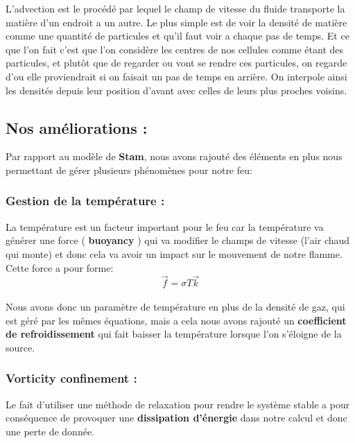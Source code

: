 \documentclass[a4paper,10pt]{article}
\begin{document}
\begin{enumerate}
  L'advection est le procédé par lequel le
    champ de vitesse du fluide transporte la matière d'un endroit a un
    autre. Le plus simple est de voir la densité de matière comme une
    quantité de particules et qu'il faut voir a chaque pas de
    temps. Et ce que l'on fait c'est que l'on considère les centres de
    nos cellules comme étant des particules, et plutôt que de regarder
    ou vont se rendre ces particules, on regarde d'ou elle
    proviendrait si on faisait un pas de temps en arrière. On
    interpole ainsi les densités depuis leur position d'avant avec
    celles de leurs plus proches voisins.\\
\end{enumerate}

\subsection{Nos améliorations :}
Par rapport au modèle de \textbf{Stam}, nous avons rajouté des éléments en plus 
nous permettant de gérer plusieurs phénomènes pour notre feu:\\
 
\subsubsection{Gestion de la température :}
La température est un facteur important pour le feu car la température
va générer une force ( \textbf{buoyancy} ) qui va modifier le champs de vitesse 
(l'air chaud qui monte) et donc cela va avoir un impact sur le mouvement de notre
flamme.\\ 
Cette force a pour forme:\\
\begin{equation}
	\vec{f} = \sigma T \vec{k} 
\end{equation}
\\

Nous avons donc un paramètre de température en plus de la densité de gaz, qui
est géré par les mêmes équations, mais a cela nous avons rajouté un
\textbf{coefficient de refroidissement} qui fait baisser la température lorsque
l'on s'éloigne de la source.\\

\subsubsection{Vorticity confinement :}
Le fait d'utiliser une méthode de relaxation pour rendre le système
stable a pour conséquence de provoquer une \textbf{dissipation d'énergie} dans
notre calcul et donc une perte de donnée. \\
\end{document}
